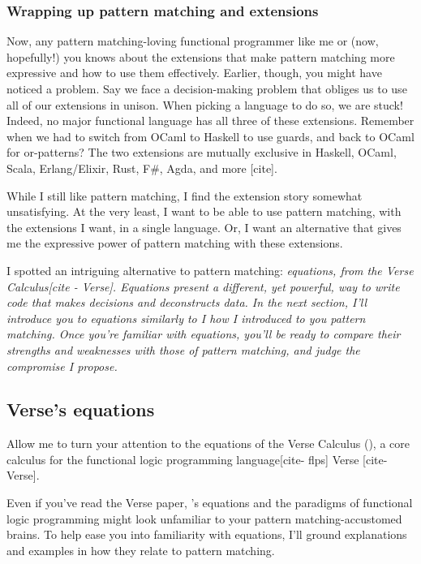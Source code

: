 \documentclass[manuscript,screen,review, 12pt, nonacm]{acmart}
\begin{document}
\begin{outline}[enumerate]
    \subsubsection{Wrapping up pattern matching and extensions}
    
    Now, any pattern matching-loving functional programmer like me or (now,
    hopefully!) you knows about the extensions that make pattern matching more
    expressive and how to use them effectively. Earlier, though, you might have
    noticed a problem. Say we face a decision-making problem that obliges us to
    use all of our extensions in unison. When picking a language to do so, we
    are stuck! Indeed, no major functional language has all three of these
    extensions. Remember when we had to switch from OCaml to Haskell to use
    guards, and back to OCaml for or-patterns? The two extensions are mutually
    exclusive in Haskell, OCaml, Scala, Erlang/Elixir, Rust, F\#, Agda, and more
    [cite]. 


    While I still like pattern matching, I find the extension story somewhat
    unsatisfying. At the very least, I want to be able to use pattern matching,
    with the extensions I want, in a single language. Or, I want an alternative
    that gives me the expressive power of pattern matching with these
    extensions. 

    I spotted an intriguing alternative to pattern matching: \it{equations},
    from the Verse Calculus[cite - Verse]. Equations present a different, yet
    powerful, way to write code that makes decisions and deconstructs data. In
    the next section, I'll introduce you to equations similarly to I how I
    introduced to you pattern matching. Once you're familiar with equations,
    you'll be ready to compare their strengths and weaknesses with those of
    pattern matching, and judge the compromise I propose. 

\subsection{Verse's equations}
    \label{verseoverobservers}

    Allow me to turn your attention to the equations of the Verse Calculus (\VC),
    a core calculus for the functional logic programming language[cite- flps]
    Verse [cite- Verse]. 

    Even if you've read the Verse paper, \VC's equations and the paradigms of
    functional logic programming might look unfamiliar to your pattern
    matching-accustomed brains. To help ease you into familiarity with
    equations, I'll ground explanations and examples in how they relate to
    pattern matching. 


\end{outline}
\end{document}
